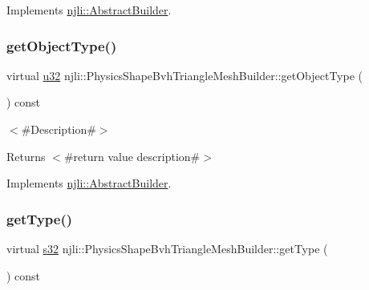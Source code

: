 Implements \mbox{\hyperlink{classnjli_1_1_abstract_builder_a902f73ea78031b06aca183a417f3413b}{njli\+::\+Abstract\+Builder}}.

\mbox{\label{classnjli_1_1_physics_shape_bvh_triangle_mesh_builder_a5be31b8731f8a5ebc9c742b1c4e88181}} 
\subsubsection{\texorpdfstring{get\+Object\+Type()}{getObjectType()}}
{\footnotesize\ttfamily virtual \mbox{\hyperlink{_util_8h_a10e94b422ef0c20dcdec20d31a1f5049}{u32}} njli\+::\+Physics\+Shape\+Bvh\+Triangle\+Mesh\+Builder\+::get\+Object\+Type (\begin{DoxyParamCaption}{ }\end{DoxyParamCaption}) const\hspace{0.3cm}{\ttfamily [virtual]}}

$<$\#\+Description\#$>$

\begin{DoxyReturn}{Returns}
$<$\#return value description\#$>$ 
\end{DoxyReturn}


Implements \mbox{\hyperlink{classnjli_1_1_abstract_builder_a0f2d344fcf697b167f4f2b1122b5fb33}{njli\+::\+Abstract\+Builder}}.

\mbox{\label{classnjli_1_1_physics_shape_bvh_triangle_mesh_builder_a356f9a0d887db5defe1748427a9be4e4}} 
\subsubsection{\texorpdfstring{get\+Type()}{getType()}}
{\footnotesize\ttfamily virtual \mbox{\hyperlink{_util_8h_aa62c75d314a0d1f37f79c4b73b2292e2}{s32}} njli\+::\+Physics\+Shape\+Bvh\+Triangle\+Mesh\+Builder\+::get\+Type (\begin{DoxyParamCaption}{ }\end{DoxyParamCaption}) const\hspace{0.3cm}{\ttfamily [virtual]}}

